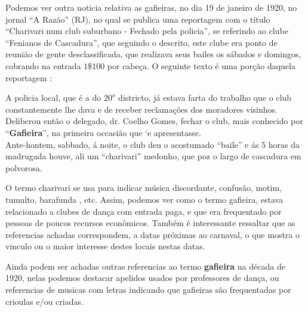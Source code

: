 Podemos ver outra noticia relativa as gafieiras, no dia 19 de janeiro de 1920, 
no jornal ``A Razão'' (RJ), no qual se
publica uma reportagem com o título 
``Charivari num club suburbano - Fechado pela policia'',
se referindo ao clube ``Fenianos de Cascadura'',
que seguindo o descrito, este clube era 
ponto de reunião de gente desclassificada, 
que realizava seus bailes os sábados e domingos,
cobrando na entrada $1\$100$ por cabeça.
O seguinte texto é uma porção daquela reportagem \cite[pp. 4]{oldgafieira4} \cite[pp. 629]{spielmann2016reflexoes}:
\begin{citando}
A policia local, que é a do $20^o$ districto,
já estava farta do trabalho que o club 
constantemente lhe dava e de receber reclamações 
dos moradores visinhos.\\
Deliberou então o delegado, dr. Coelho
Gomes, fechar o club, mais conhecido por 
``\textbf{Gafieira}'', na primeira occasião que `e apresentasse.\\
Ante-hontem, sabbado, á noite, o club 
deu o acostumado ``baile'' e ás 5 horas da 
madrugada houve, ali um ``charivari'' medonho,
que poz o largo de cascadura em polvorosa. 
\end{citando}
O termo charivari se usa para indicar música discordante, 
confusão, motim, tumulto, barafunda \cite[pp. 53]{almeida1996dicionario}, etc.
Assim, podemos ver como o termo gafieira, 
estava relacionado a clubes de dança com entrada paga,
e que era frequentado por pessoas de poucos recursos econômicos. 
Também é interessante ressaltar que as referencias achadas correspondem,
a datas próximas ao carnaval, o que mostra o vinculo ou o maior interesse 
destes locais nestas datas. 

Ainda podem ser achadas outras referencias ao termo \textbf{gafieira} na década de 1920,
nelas podemos destacar apelidos usados por professores de dança,
ou referencias de musicas com letras indicando que gafieiras 
são frequentadas por crioulas e/ou criadas.



